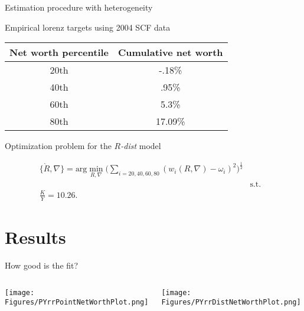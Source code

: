 \documentclass{beamer}
\begin{document}
\begin{frame}{Estimation procedure with heterogeneity}

\small
\par Empirical lorenz targets using 2004 SCF data \vspace{2mm}

\centering
\begin{tabular}{|c|c|}
\hline
Net worth percentile & Cumulative net worth \\
\hline
20th & -.18\%  \\
40th &  .95\% \\
60th &  5.3\% \\
80th &  17.09\% \\
\hline
\end{tabular}

\begin{flushleft}
\par Optimization problem for the $R$\textit{-dist} model 
\end{flushleft}

\vspace{-7.5mm}
 \begin{eqnarray*}
  \{\grave{R}, \nabla\} = \text{arg}\min_{R, \nabla} \bigg( \sum_{i=20, 40, 60, 80} (w_{i}(R, \nabla)-\omega_i )^{2} \bigg)^{\frac{1}{2}}\\
  &\text{s.t.}& \\
  \frac{K}{Y} = 10.26. %
\end{eqnarray*}


\end{frame}

\section{Results}

\begin{frame}{How good is the fit?}
    
   \begin{columns}
    \centering
    \texttt{[image: Figures/PYrrPointNetWorthPlot.png]}
    
    \centering
    \texttt{[image: Figures/PYrrDistNetWorthPlot.png]}

  \end{columns}
    
\end{frame}
\end{document}
